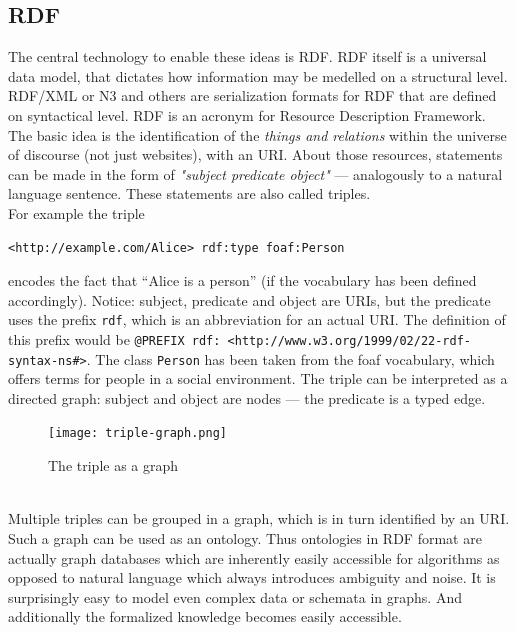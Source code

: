 \subsection{RDF}
The central technology to enable these ideas is RDF. 
RDF itself is a universal data model, that dictates how information may be medelled on a structural level. RDF/XML or  N3 and others are serialization formats for RDF that are defined on syntactical level.
RDF is an acronym for Resource Description Framework. 
The basic idea is the identification of the \textit{things and relations} within the universe of discourse (not just websites), with an URI. 
About those resources, statements can be made in the form of \textit{"subject predicate object"} --- analogously to a natural language sentence. 
These statements are also called triples.\\
For example the triple 
\begin{lstlisting}[style=N3]
<http://example.com/Alice> rdf:type foaf:Person
\end{lstlisting}
encodes the fact that ``Alice is a person'' (if the vocabulary has been defined accordingly). 
Notice: subject, predicate and object are URIs, but the predicate uses the prefix \texttt{rdf}, which is an abbreviation for an actual URI. 
The definition of this prefix would be \verb+@PREFIX rdf: <http://www.w3.org/1999/02/22-rdf-syntax-ns#>+. 
The class \texttt{Person} has been taken from the foaf vocabulary, which offers terms for people in a social environment. 
The triple can be interpreted as a directed graph: subject and object are nodes --- the predicate is a typed edge.\\
\begin{figure}[h]
  \centering
    \texttt{[image: triple-graph.png]}
  \caption{The triple as a graph}
  \label{fig:triple-graph}
\end{figure}
\\
Multiple triples can be grouped in a graph, which is in turn identified by an URI. 
Such a graph can be used as an ontology. 
Thus ontologies in RDF format are actually graph databases which are inherently easily accessible for algorithms as opposed to natural language which always introduces ambiguity and noise. 
It is surprisingly easy to model even complex data or schemata in graphs. 
And additionally the formalized knowledge becomes easily accessible. 
